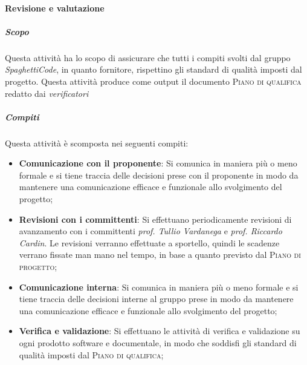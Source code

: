 \paragraph{Revisione e valutazione}
\label{par:revisione_e_valutazione}
\subparagraph{Scopo}
\label{par:revisione_e_valutazione:scopo}
Questa attività ha lo scopo di assicurare che tutti i compiti svolti dal gruppo \emph{SpaghettiCode}, in quanto fornitore, rispettino gli standard di qualità imposti dal progetto. Questa attività produce come output il documento \textsc{Piano di qualifica} redatto dai \emph{verificatori} \\
\subparagraph{Compiti}
\label{par:revisione_e_valutazione:Compiti}
Questa attività è scomposta nei seguenti compiti:
\begin{itemize}
    \item \textbf{Comunicazione con il proponente}: Si comunica in maniera più o meno formale e si tiene traccia delle decisioni prese con il proponente in modo da mantenere una comunicazione efficace e funzionale allo svolgimento del progetto;
    \item \textbf{Revisioni con i committenti}: Si effettuano periodicamente revisioni di avanzamento con i committenti \emph{prof. Tullio Vardanega} e \emph{prof. Riccardo Cardin}. Le revisioni verranno effettuate a sportello, quindi le scadenze verrano fissate man mano nel tempo, in base a quanto previsto dal \textsc{Piano di progetto};
    \item \textbf{Comunicazione interna}: Si comunica in maniera più o meno formale e si tiene traccia delle decisioni interne al gruppo prese in modo da mantenere una comunicazione efficace e funzionale allo svolgimento del progetto;
    \item \textbf{Verifica e validazione}: Si effettuano le attività di verifica e validazione su ogni prodotto software e documentale, in modo che soddisfi gli standard di qualità imposti dal \textsc{Piano di qualifica};
\end{itemize}
